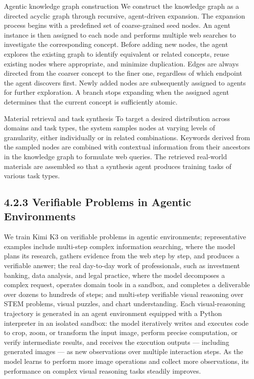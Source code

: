 \documentclass[
  10
]{article}
\begin{document}
Agentic knowledge graph construction We construct the knowledge graph as
a directed acyclic graph through recursive, agent-driven expansion. The
expansion process begins with a predefined set of coarse-grained seed
nodes. An agent instance is then assigned to each node and performs
multiple web searches to investigate the corresponding concept. Before
adding new nodes, the agent explores the existing graph to identify
equivalent or related concepts, reuse existing nodes where appropriate,
and minimize duplication. Edges are always directed from the coarser
concept to the finer one, regardless of which endpoint the agent
discovers first. Newly added nodes are subsequently assigned to agents
for further exploration. A branch stops expanding when the assigned
agent determines that the current concept is sufficiently atomic.

Material retrieval and task synthesis To target a desired distribution
across domains and task types, the system samples nodes at varying
levels of granularity, either individually or in related combinations.
Keywords derived from the sampled nodes are combined with contextual
information from their ancestors in the knowledge graph to formulate web
queries. The retrieved real-world materials are assembled so that a
synthesis agent produces training tasks of various task types.

\subsection{4.2.3 Verifiable Problems in Agentic
Environments}\label{verifiable-problems-in-agentic-environments}

We train Kimi K3 on verifiable problems in agentic environments;
representative examples include multi-step complex information
searching, where the model plans its research, gathers evidence from the
web step by step, and produces a verifiable answer; the real day-to-day
work of professionals, such as investment banking, data analysis, and
legal practice, where the model decomposes a complex request, operates
domain tools in a sandbox, and completes a deliverable over dozens to
hundreds of steps; and multi-step verifiable visual reasoning over STEM
problems, visual puzzles, and chart understanding. Each visual-reasoning
trajectory is generated in an agent environment equipped with a Python
interpreter in an isolated sandbox: the model iteratively writes and
executes code to crop, zoom, or transform the input image, perform
precise computation, or verify intermediate results, and receives the
execution outputs --- including generated images --- as new observations
over multiple interaction steps. As the model learns to perform more
image operations and collect more observations, its performance on
complex visual reasoning tasks steadily improves.
\end{document}
